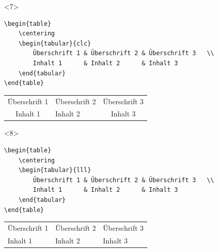 \begin{frame}[fragile]
	\begin{onlyenv}
		\Code
		\begin{lstlisting}
\begin{table}
	\centering
	\begin{tabular}{clc}
		Überschrift 1 & Überschrift 2 & Überschrift 3	\\
		Inhalt 1      & Inhalt 2      & Inhalt 3
	\end{tabular}
\end{table}
		\end{lstlisting}
		\Ausgabe
		\begin{outputbox}
			\begin{table}
				\centering
				\begin{tabular}{clc}
					Überschrift 1 & Überschrift 2 & Überschrift 3	\\
					Inhalt 1 & Inhalt 2 & Inhalt 3
				\end{tabular}
			\end{table}
		\end{outputbox}
	\end{onlyenv}

	\begin{onlyenv}
		\Code
		\begin{lstlisting}
\begin{table}
	\centering
	\begin{tabular}{lll}
		Überschrift 1 & Überschrift 2 & Überschrift 3	\\
		Inhalt 1      & Inhalt 2      & Inhalt 3
	\end{tabular}
\end{table}
		\end{lstlisting}
		\Ausgabe
		\begin{outputbox}
			\begin{table}
				\centering
				\begin{tabular}{lll}
					Überschrift 1 & Überschrift 2 & Überschrift 3	\\
					Inhalt 1 & Inhalt 2 & Inhalt 3
				\end{tabular}
			\end{table}
		\end{outputbox}
	\end{onlyenv}


\end{frame}
